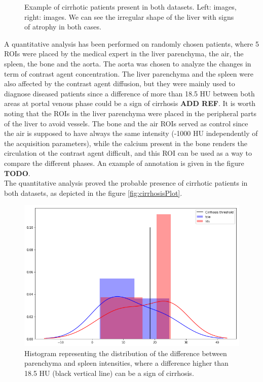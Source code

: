 {\begin{figure}[!ht]
\begin{mdframed}[backgroundcolor=blue!50,linecolor=blue!50]
\begin{minipage}{6cm}
		\end{minipage}
	\end{mdframed}
	\caption{Example of cirrhotic patients present in both datasets.  Left: \textbf{} images, right: \textbf{} images. We can see the irregular shape of the liver with signs of atrophy in both cases.}
\end{figure}
A quantitative analysis has been performed on randomly chosen patients, where 5 ROIs were placed by the medical expert in the liver parenchyma, the air, the spleen, the bone and the aorta. The aorta was chosen to analyze the changes in term of contrast agent concentration. The liver parenchyma and the spleen were also affected by the contrast agent diffusion, but they were mainly used to diagnose diseased patients since a difference of more than 18.5 HU between both areas at portal venous phase could be a sign of cirrhosis \textbf{ADD REF}. It is worth noting that the ROIs in the liver parenchyma were placed in the peripheral parts of the liver to avoid vessels. The bone and the air ROIs served as control since the air is supposed to have always the same intensity (-1000 HU independently of the acquisition parameters), while the calcium present in the bone renders the circulation ot the contrast agent difficult, and this ROI can be used as a way to compare the different phases. An example of annotation is given in the figure \textbf{TODO}. \\
The quantitative analysis proved the probable presence of cirrhotic patients in both datasets, as depicted in the figure \ref{fig:cirrhosisPlot}.
\begin{figure}[!ht]
	\begin{mdframed}[backgroundcolor=blue!50,linecolor=blue!50]
		\centering
		\includegraphics[width=0.6\linewidth]{images/LITS_TCIA_cirrhosisPlot}
		\caption{Histogram representing the distribution of the difference between parenchyma and spleen intensities, where a difference higher than 18.5 HU (black vertical line) can be a sign of cirrhosis.}

\end{mdframed}
\end{figure}}
